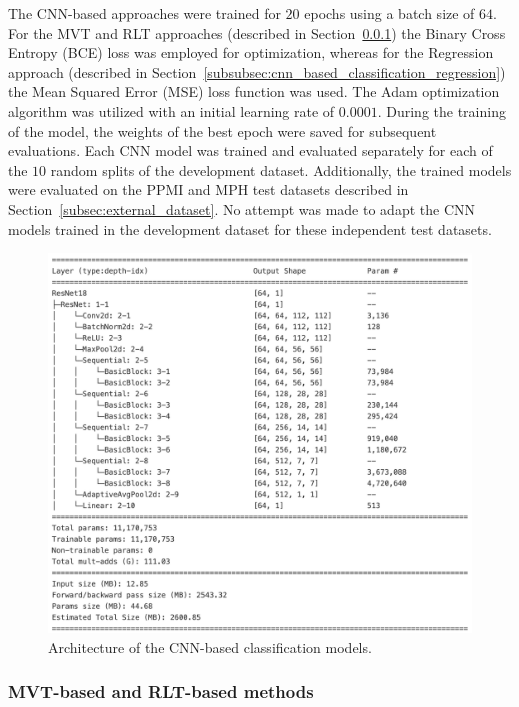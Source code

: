 The CNN-based approaches were trained for $20$ epochs using a batch size of $64$.
For the MVT and RLT approaches (described in Section~\ref{subsubsec:cnn_based_classification_mvt_rlt}) 
the Binary Cross Entropy (BCE) loss was employed for optimization, 
whereas for the Regression approach (described in Section~\ref{subsubsec:cnn_based_classification_regression}) 
the Mean Squared Error (MSE) loss function was used.
The Adam optimization algorithm was utilized with an initial learning rate of $0.0001$.
During the training of the model, the weights of the best epoch were saved for subsequent evaluations.
Each CNN model was trained and evaluated separately for each of the $10$ random splits of the development dataset.
Additionally, the trained models were evaluated on the PPMI and MPH test datasets described in Section~\ref{subsec:external_dataset}.
No attempt was made to adapt the CNN models trained in the development dataset for these independent test datasets.

\begin{figure}[t]
  \centering
  \includegraphics[width=1.0\textwidth]{content/figures/cnn_architecture.png}
  \caption{Architecture of the CNN-based classification models.} 
  \label{fig:resnet}
\end{figure} 

\subsubsection{MVT-based and RLT-based methods}
\label{subsubsec:cnn_based_classification_mvt_rlt}

